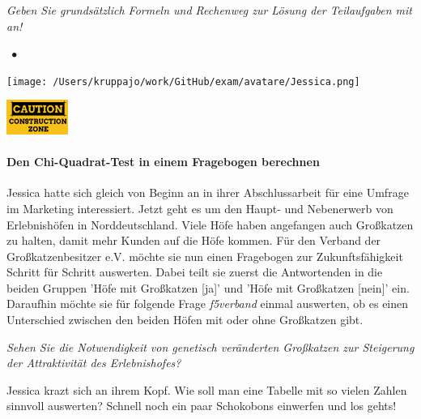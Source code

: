 \documentclass[a4paper, 9pt]{scrartcl}\usepackage[]{graphicx}\usepackage[]{xcolor}
\begin{document}
\textit{Geben Sie grundsätzlich Formeln und Rechenweg zur Lösung der Teilaufgaben mit an!} \\[1Ex]
 

 
\ifcollection
\begin{flushright}
\tiny\vspace{-3Ex}
\textbf{\examinhaltstart}
\exammodulestat $\;\bullet$
\exammodulestatbbv 
\vspace{-4Ex}
\end{flushright}
\begin{minipage}[t]{0.5\textwidth}
\texttt{[image: /Users/kruppajo/work/GitHub/exam/avatare/Jessica.png]}
\end{minipage}
\begin{minipage}[t]{0.5\textwidth}
\hfill
\href{https://youtu.be/-Kva5wc5Elw}{\includegraphics[width = 2cm]{img/caution}}
\end{minipage}
\vspace{-3Ex}
\fi



\ifcollection
\paragraph{Den Chi-Quadrat-Test in einem Fragebogen berechnen}
\fi

Jessica hatte sich gleich von Beginn an in ihrer Abschlussarbeit für eine Umfrage im Marketing interessiert. Jetzt geht es um den Haupt- und Nebenerwerb von Erlebnishöfen in Norddeutschland. Viele Höfe haben angefangen auch Großkatzen zu halten, damit mehr Kunden auf die Höfe kommen. Für den Verband der Großkatzenbesitzer e.V. möchte sie nun einen Fragebogen zur Zukunftsfähigkeit Schritt für Schritt auswerten. Dabei teilt sie zuerst die Antwortenden in die beiden Gruppen 'Höfe mit Großkatzen [ja]' und 'Höfe mit Großkatzen [nein]' ein. Daraufhin möchte sie für folgende Frage \textit{f5verband} einmal auswerten, ob es einen Unterschied zwischen den beiden Höfen mit oder ohne Großkatzen gibt. \begin{center}\textit{Sehen Sie die Notwendigkeit von genetisch veränderten Großkatzen zur Steigerung der Attraktivität des Erlebnishofes?}\end{center}Jessica krazt sich an ihrem Kopf. Wie soll man eine Tabelle mit so vielen Zahlen sinnvoll auswerten? Schnell noch ein paar Schokobons einwerfen und los gehts!
\end{document}
